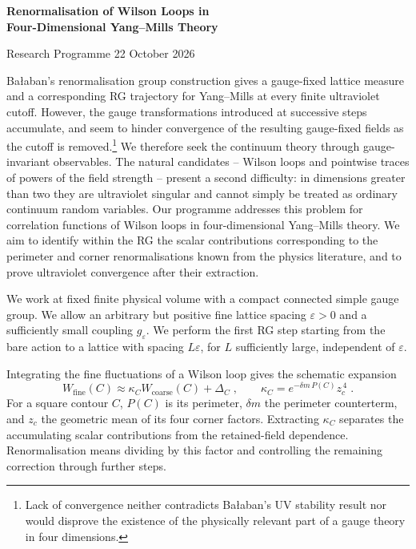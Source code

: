 \documentclass[10pt,a4paper]{article}
\newcommand{\subhead}[1]{\par\vspace{5pt}{\large\bfseries\color{ink}#1\par}\vspace{3pt}}
\begin{document}
\thispagestyle{plain}
{\LARGE\bfseries\color{ink}Renormalisation of Wilson Loops in\\[3pt]Four-Dimensional Yang--Mills Theory\par}
\vspace{5pt}
{\small\color{muted}Research Programme \hfill 22 October 2026\par}
\vspace{10pt}

Ba{\l}aban's renormalisation group construction gives a gauge-fixed lattice measure and a corresponding RG trajectory for Yang--Mills at every finite ultraviolet cutoff. However, the gauge transformations introduced at successive steps accumulate, and seem to hinder convergence of the resulting gauge-fixed fields as the cutoff is removed.\footnote{Lack of convergence neither contradicts Ba{\l}aban's UV stability result nor would disprove the existence of the physically relevant part of a gauge theory in four dimensions.} We therefore seek the continuum theory through gauge-invariant observables. The natural candidates -- Wilson loops and pointwise traces of powers of the field strength -- present a second difficulty: in dimensions greater than two they are ultraviolet singular and cannot simply be treated as ordinary continuum random variables. Our programme addresses this problem for correlation functions of Wilson loops in four-dimensional Yang--Mills theory. We aim to identify within the RG the scalar contributions corresponding to the perimeter and corner renormalisations known from the physics literature, and to prove ultraviolet convergence after their extraction.

\subhead{Idea of the Method}

We work at fixed finite physical volume with a compact connected simple gauge group. We allow an arbitrary but positive fine lattice spacing $\varepsilon > 0$ and a sufficiently small coupling $g_\varepsilon$. We perform the first RG step starting from the bare action to a lattice with spacing $L \varepsilon$, for $L$ sufficiently large, independent of $\varepsilon$. 

Integrating the fine fluctuations of a Wilson loop gives the schematic expansion
\begin{equation*}
    W_{\mathrm{fine}}(C)\approx \kappa_C W_{\mathrm{coarse}}(C)+\Delta_C\;,\qquad
    \kappa_C=e^{-\delta m\,P(C)}z_c^{\,4}\;.
\end{equation*}
For a square contour $C$, $P(C)$ is its perimeter, $\delta m$ the perimeter counterterm, and $z_c$ the geometric mean of its four corner factors. Extracting $\kappa_C$ separates the accumulating scalar contributions from the retained-field dependence. Renormalisation means dividing by this factor and controlling the remaining correction through further steps.
\end{document}
